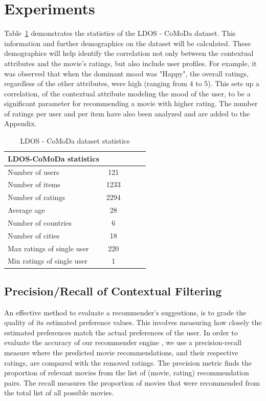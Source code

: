 \documentclass{article}
\begin{document}
\section{Experiments}
Table~\ref{ldos} demonstrates the statistics of the LDOS - CoMoDa dataset. This information and further demographics on the dataset will be calculated. These demographics will help identify the correlation not only between the contextual attributes and the movie's ratings, but also include user profiles. For example, it was observed that when the dominant mood was "Happy", the overall ratings, regardless of the other attributes, were high (ranging from 4 to 5). This sets up a correlation, of the contextual attribute modeling the mood of the user, to be a significant parameter for recommending a movie with higher rating. The number of ratings per user and per item have also been analyzed and are added to the Appendix.

\begin{table} [H]
	\caption{LDOS - CoMoDa dataset statistics}
	\label{ldos}
	\vskip 0.15in      
	\begin{center}
	\begin{small}
	\begin{sc}
    \begin{tabular}{lcccr}
	\hline
	\abovespace\belowspace
	LDOS-CoMoDa statistics\\
    \hline
    \abovespace
    Number of users            & 121 \\
    Number of items            & 1233  \\
    Number of ratings          & 2294  \\
    Average age                & 28  \\
    Number of countries        & 6  \\
    Number of cities           & 18  \\
    Max ratings of single user & 220  \\
    \belowspace
	Min ratings of single user & 1  \\
	\hline
	\end{tabular}
	\end{sc}
	\end{small}
	\end{center}
	\vskip -0.1in
\end{table}

\subsection{Precision/Recall of Contextual Filtering}
An effective method to evaluate a recommender's suggestions, is to grade the quality of its estimated preference values. This involves measuring how closely the estimated preferences match the actual preferences of the user. In order to evaluate the accuracy of our recommender engine , we use a precision-recall measure where the predicted movie recommendations, and their respective ratings, are compared with the removed ratings. The precision metric finds the proportion of relevant movies from the list of (movie, rating) recommendation pairs. The recall measures the proportion of movies that were recommended from the total list of all possible movies. 
\end{document}

